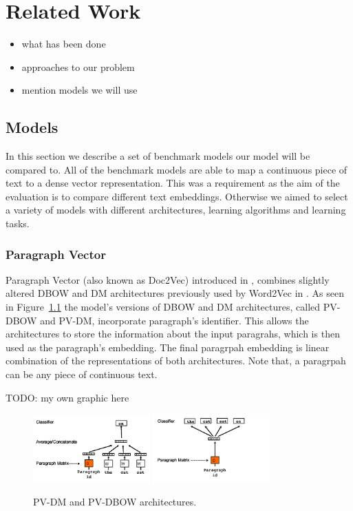 \chapter{Related Work}

\begin{itemize}
    \item what has been done
    \item approaches to our problem
    \item mention models we will use
\end{itemize}

\section{Models}

In this section we describe a set of benchmark models our model will be compared
to. All of the benchmark models are able to map a continuous piece of text to a
dense vector representation. This was a requirement as the aim of the evaluation
is to compare different text embeddings. Otherwise we aimed to select a variety
of models with different architectures, learning algorithms and learning tasks.

\subsection{Paragraph Vector}

Paragraph Vector (also known as Doc2Vec) introduced in \cite{le2014distributed},
combines slightly altered DBOW and DM architectures previously used by Word2Vec
in \cite{mikolov2013efficient}. As seen in Figure~\ref{fig:pv-dm_pv-dbow} the
model's versions of DBOW and DM architectures, called PV-DBOW and PV-DM,
incorporate paragraph's identifier. This allows the architectures to store the
information about the input paragrahs, which is then used as the paragraph's
embedding. The final paragrpah embedding is linear combination of the
representations of both architectures. Note that, a paragrpah can be any piece
of continuous text.

TODO: my own graphic here

\begin{figure}[h]
    \centering
    \includegraphics[width=0.4\textwidth]{./img/pv-dm.png}
    \includegraphics[width=0.4\textwidth]{./img/pv-dbow.png}
    \caption{PV-DM and PV-DBOW architectures.\label{fig:pv-dm_pv-dbow}}
\end{figure}

